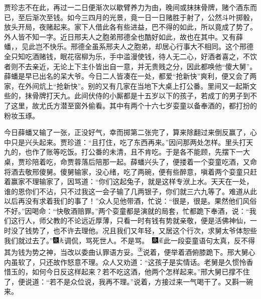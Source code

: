 贾珍志不在此，再过一二日便渐次以歇臂养力为由，晚间或抹抹骨牌，赌个酒东而已，至后渐次至钱。如今三四月的光景，竟一日一日赌胜于射了，公然斗叶掷骰，放头开局，夜赌起来。家下人借此各有些进益，巴不得的如此，所以竟成了势了。外人皆不知一字。近日邢夫人之胞弟邢德全也酷好如此，故也在其中。又有薛蟠，，见此岂不快乐。邢德全虽系邢夫人之胞弟，却居心行事大不相同。这个邢德全只知吃酒赌钱，眠花宿柳为乐，手中滥漫使钱，待人无二心，好酒者喜之，不饮者则不去亲近，无论上下主仆皆出自一意，并无贵贱之分，因此都唤他``傻大舅''。薛蟠是早已出名的呆大爷。今日二人皆凑在一处，都爱``抢新快''爽利，便又会了两家，在外间炕上``抢新快''。别的又有几家在当地下大桌上打公番。里间又一起斯文些的，抹骨牌打天九。此间伏侍的小厮都是十五岁以下的孩子，若成丁的男子到不了这里，故尤氏方潜至窗外偷看。其中有两个十六七岁娈童以备奉酒的，都打扮的粉妆玉琢。

今日薛蟠又输了一张，正没好气，幸而掷第二张完了，算来除翻过来倒反赢了，心中只是兴头起来。贾珍道：``且打住，吃了东西再来。''因问那两处怎样。里头打天九的，也作了账等吃饭。打公番的未清，且不肯吃。于是各不能顾，先摆下一大桌，贾珍陪着吃，命贾蓉落后陪那一起。薛蟠兴头了，便搂着一个娈童吃酒，又命将酒去敬邢傻舅。傻舅输家，没心绪，吃了两碗，便有些醉意，嗔着两个娈童只赶着赢家不理输家了，因骂道：``你们这起兔子，就是这样专洑上水。天天在一处，谁的恩你们不沾，只不过我这一会子输了几两银子，你们就三六九等了。难道从此以后再没有求着我们的事了！''众人见他带酒，忙说：``很是，很是。果然他们风俗不好。''因喝命：``快敬酒赔罪。''两个娈童都是演就的局套，忙都跪下奉酒，说：``我们这行人，师父教的不论远近厚薄，只看一时有钱有势就亲敬，便是活佛神仙，一时没了钱势了，也不许去理他。况且我们又年轻，又居这个行次，求舅太爷体恕些我们就过去了。''{\includegraphics[width=3mm]{../Images/00004}\includegraphics[width=3mm]{../Images/00012}\footnotesize \kaishu 调侃，骂死世人。不是骂。　\includegraphics[width=3mm]{../Images/00004}\includegraphics[width=3mm]{../Images/00010}\footnotesize \kaishu 此一段娈童语句太真，反不得其为钱为势之神，当改以委曲认罪语方妥。}\href{../Text/part0079_split_000.html\#lnkback_3_a}{\textsuperscript{③}}说着，便举着酒俯膝跪下。邢大舅心内虽软了，只还故作怒意不理。众人又劝道：``这孩子是实情话。老舅是久惯怜香惜玉的，如何今日反这样起来？若不吃这酒，他两个怎样起来。''邢大舅已撑不住了，便说道：``若不是众位说，我再不理。''说着，方接过来一气喝干了。又斟一碗来。

